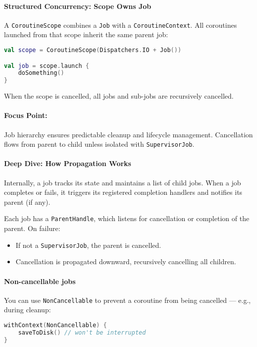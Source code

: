 \documentclass[a4paper,12pt]{article}
\begin{document}
\paragraph{Structured Concurrency: Scope Owns Job}
A \texttt{CoroutineScope} combines a \texttt{Job} with a \texttt{CoroutineContext}. All coroutines launched from that scope inherit the same parent job:

\begin{lstlisting}[language=Kotlin]
val scope = CoroutineScope(Dispatchers.IO + Job())

val job = scope.launch {
    doSomething()
}
\end{lstlisting}

When the scope is cancelled, all jobs and sub-jobs are recursively cancelled.

\paragraph{Focus Point:} Job hierarchy ensures predictable cleanup and lifecycle management. Cancellation flows from parent to child unless isolated with \texttt{SupervisorJob}.

\paragraph{Deep Dive: How Propagation Works}
Internally, a job tracks its state and maintains a list of child jobs. When a job completes or fails, it triggers its registered completion handlers and notifies its parent (if any).

Each job has a \texttt{ParentHandle}, which listens for cancellation or completion of the parent. On failure:
\begin{itemize}
  \item If not a \texttt{SupervisorJob}, the parent is cancelled.
  \item Cancellation is propagated downward, recursively cancelling all children.
\end{itemize}

\paragraph{Non-cancellable jobs}
You can use \texttt{NonCancellable} to prevent a coroutine from being cancelled — e.g., during cleanup:

\begin{lstlisting}[language=Kotlin]
withContext(NonCancellable) {
    saveToDisk() // won't be interrupted
}
\end{lstlisting}
\end{document}

